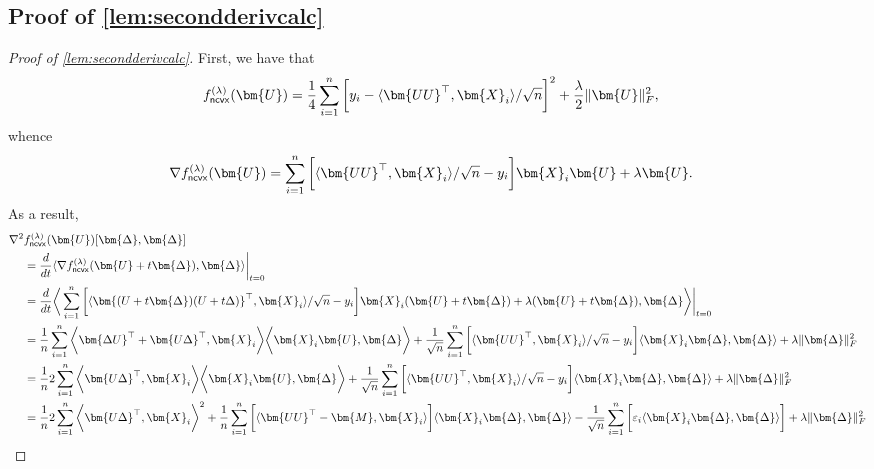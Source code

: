 \documentclass[10pt]{article}
\newcommand{\eps}{\ensuremath{\varepsilon}}
\renewcommand{\t}{^{\top}}
\theoremstyle{definition}
\begin{document}
\subsection{Proof of \cref{lem:secondderivcalc}} \label{sec:secondderivcalc}
\begin{proof}[Proof of \cref{lem:secondderivcalc}]
First, we have that 
\begin{align}
    f^{(\lambda)}_{{\sf ncvx}}(\bm{U}) &= \frac{1}{4} \sum_{i=1}^{n} \bigg[ y_i - \langle \bm{UU}\t, \bm{X}_i \rangle/\sqrt{n} \bigg]^2 + \frac{\lambda}{2} \| \bm{U} \|_F^2,
\end{align}
whence
\begin{align}
    \nabla f^{(\lambda)}_{{\sf ncvx}}(\bm{U}) &= \sum_{i=1}^{n} \bigg[ \langle \bm{UU}\t , \bm{X}_i \rangle/\sqrt{n} - y_i \bigg] \bm{X}_i\bm{U} + \lambda \bm{U}.
\end{align}
As a result,
\begin{align}
    \nabla^2 &f^{(\lambda)}_{{\sf ncvx}}(\bm{U})[ \bm{\Delta},\bm{\Delta}] \\
    &= \frac{d}{dt} \langle \nabla f^{(\lambda)}_{{\sf ncvx}}(\bm{U} + t \bm{\Delta}) , \bm{\Delta} \rangle\bigg|_{t=0} \\
    &= \frac{d}{dt} \bigg\langle \sum_{i=1}^{n} \bigg[ \langle \bm{(U + t \bm{\Delta})(U + t \Delta)}\t , \bm{X}_i \rangle/\sqrt{n} - y_i \bigg] \bm{X}_i (\bm{U} + t \bm{\Delta}) + \lambda (\bm{U} + t \bm{\Delta}) , \bm{\Delta} \bigg\rangle\bigg|_{t=0} \\
    &=   \frac{1}{n}\sum_{i=1}^{n} \bigg \langle \bm{\Delta U}\t + \bm{U\Delta}\t, \bm{X}_i \bigg \rangle \bigg\langle \bm{X}_i \bm{U}, \bm{\Delta} \bigg \rangle + \frac{1}{\sqrt{n}} \sum_{i=1}^{n} \bigg[  \langle \bm{UU}\t , \bm{X}_i \rangle/\sqrt{n} - y_i \bigg] \langle \bm{X}_i \bm{\Delta},\bm{\Delta} \rangle +  \lambda \| \bm{\Delta} \|_F^2
    \\
    &=  \frac{1}{n} 2 \sum_{i=1}^{n} \bigg \langle  \bm{U\Delta}\t, \bm{X}_i \bigg \rangle \bigg\langle \bm{X}_i \bm{U}, \bm{\Delta} \bigg \rangle + \frac{1}{\sqrt{n}} \sum_{i=1}^{n} \bigg[  \langle \bm{UU}\t , \bm{X}_i \rangle/\sqrt{n} - y_i \bigg] \langle \bm{X}_i \bm{\Delta},\bm{\Delta} \rangle + \lambda \| \bm{\Delta} \|_F^2  \\
    &= \frac{1}{n} 2 \sum_{i=1}^{n} \bigg \langle  \bm{U\Delta}\t, \bm{X}_i \bigg \rangle^2  + \frac{1}{n} \sum_{i=1}^{n} \bigg[  \langle \bm{UU}\t - \bm{M} , \bm{X}_i \rangle \bigg] \langle \bm{X}_i \bm{\Delta},\bm{\Delta} \rangle - \frac{1}{\sqrt{n}}\sum_{i=1}^{n} \bigg[ \eps_i \langle \bm{X}_i \bm{\Delta}, \bm{\Delta} \rangle \bigg] +\lambda \| \bm{\Delta} \|_F^2 \\

\end{align}
\end{proof}
\end{document}
